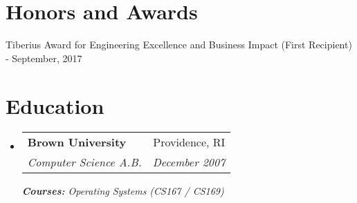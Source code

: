 \documentclass[a4paper,20pt]{article}
\makeatletter
\newcommand{\resumeSubheading}[4]{
  \vspace{-1pt}\item
    \begin{tabular*}{0.97\textwidth}{l@{\extracolsep{\fill}}r}
      \textbf{#1} & #2 \\
      \textit{#3} & \textit{#4} \\
    \end{tabular*}\vspace{-5pt}
}
\newcommand{\resumeSubHeadingListStart}{\begin{itemize}[leftmargin=*]}
\newcommand{\resumeSubHeadingListEnd}{\end{itemize}}
\makeatother
\begin{document}
\vspace{-5pt}
\section{Honors and Awards}
\begin{description}[font=$\bullet$]
    \item {Tiberius Award for Engineering Excellence and Business Impact (First Recipient) - September, 2017}

\end{description}

\vspace{-5pt}
\section{Education}
  \resumeSubHeadingListStart
    \resumeSubheading
      {Brown University}{Providence, RI}
      {Computer Science A.B.}{December 2007}
      {\scriptsize \textit{ \footnotesize{\newline{}\textbf{Courses:} Operating Systems (CS167 / CS169)}}}
    \resumeSubHeadingListEnd
	    
\end{document}

